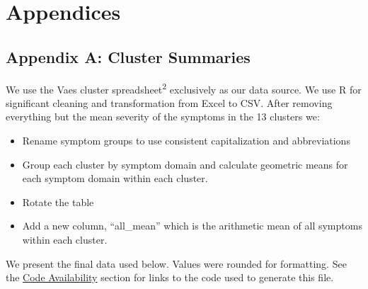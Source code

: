 \documentclass[
  letterpaper,
  DIV=11,
  numbers=noendperiod]{scrartcl}
\providecommand{\tightlist}{%
  \setlength{\itemsep}{0pt}\setlength{\parskip}{0pt}}
\begin{document}
\clearpage

\section{Appendices}\label{appendices}

\FloatBarrier

\subsection*{Appendix A: Cluster Summaries}\label{sec-cluster-data}

We use the Vaes cluster spreadsheet\textsuperscript{2} exclusively as
our data source. We use R for significant cleaning and transformation
from Excel to CSV. After removing everything but the mean severity of
the symptoms in the 13 clusters we:

\begin{itemize}
\tightlist
\item
  Rename symptom groups to use consistent capitalization and
  abbreviations
\item
  Group each cluster by symptom domain and calculate geometric means for
  each symptom domain within each cluster.
\item
  Rotate the table
\item
  Add a new column, ``all\_mean'' which is the arithmetic mean of all
  symptoms within each cluster.
\end{itemize}

We present the final data used below. Values were rounded for
formatting. See the \hyperref[sec-code]{Code Availability} section for
links to the code used to generate this file.
\end{document}
